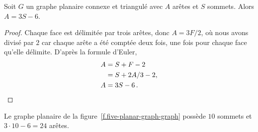 \vspace{0.4cm}

\begin{minipage}{0.4\textwidth}
\centering     
{}
         \label{f.five-connected-remains}
         
     \end{minipage}
     \hspace{3em}
     \begin{minipage}{0.4\textwidth}
\centering    
{}
         \label{f.five-connected-fewer}
     \end{minipage}

\vspace{0.4cm}





\begin{theorem}\label{th43}
Soit $G$ un graphe planaire connexe et triangulé avec $A$ arêtes et $S$ sommets. Alors $A= 3S-6$.
\end{theorem}
\begin{proof}
Chaque face est délimitée par trois arêtes, donc $A=3F/2$, où nous avons divisé par $2$ car chaque arête a été comptée deux fois, une fois pour chaque face qu'elle délimite. D'après la formule d'Euler,
\begin{align*}
A&=S+F-2\\
&=S+2A/3-2,\\
A&=3S-6\,.\qedhere
\end{align*}
\end{proof}

\begin{example}
Le graphe planaire de la figure~\ref{f.five-planar-graph-graph} possède $10$ sommets et $3\cdot 10-6=24$ arêtes.
\end{example}

